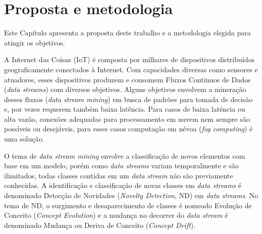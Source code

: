 \chapter{Proposta e metodologia}\label{cha:proposta}


\begin{resumocap}

  Este Capítulo apresenta a proposta deste trabalho e a metodologia elegida para
  atingir os objetivos.

\end{resumocap}

\newcommand{\fog}{\emph{fog computing}\xspace}
\newcommand{\cloud}{\emph{cloud computing}\xspace}

\newcommand{\iot}{IoT\xspace}

\newcommand{\stream}{\emph{data stream}\xspace}
\newcommand{\streams}{\emph{data streams}\xspace}
\newcommand{\streamMining}{\emph{data stream mining}\xspace}

\newcommand{\novelty}{\emph{Novelty Detection}\xspace}
\newcommand{\nd}{ND\xspace}
\newcommand{\drift}{\emph{Concept Drift}\xspace}
\newcommand{\evolution}{\emph{Concept Evolution}\xspace}

\newcommand{\mfog}{M-FOG\xspace}
\newcommand{\flink}{\emph{Apache Flink}\xspace}

A Internet das Coisas (\iot) é composta por milhares de dispositivos distribuídos
geograficamente conectados à Internet.
Com capacidades diversas como sensores e atuadores, esses dispositivos produzem e
consomem Fluxos Continuos de Dados (\streams) com diversos objetivos.
Alguns objetivos envolvem a mineração desses fluxos (\streamMining) em busca de
padrões para tomada de decisão e, por vezes requerem também baixa latência.
Para casos de baixa latência ou alta vazão, conexões adequadas para
processamento em nuvem nem sempre são possíveis ou desejáveis, para esses casos
computação em névoa (\fog) é uma solução.

O tema de \streamMining envolve a classificação de novos elementos com base em
um modelo, porém como \streams variam temporalmente e são ilimitados, todas
classes contidas em um \stream não são previamente conhecidas.
A identificação e classificação de novas classes em \streams é denominado
Detecção de Novidades (\novelty, \nd) em \streams.
No tema de \nd, o surgimento e desaparecimento de classes é nomeado Evolução de Conceito
(\evolution) e a mudança no decorrer do \stream é denominado Mudança ou Deriva
de Conceito (\drift).

